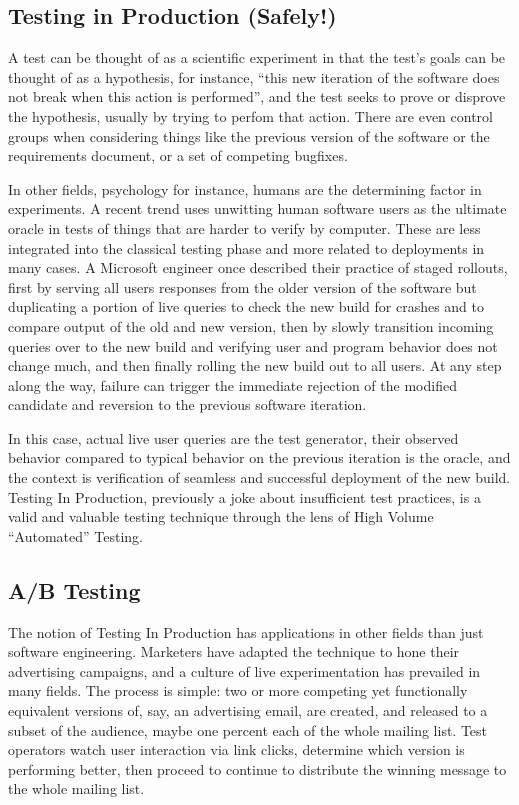 \subsection{Testing in Production (Safely!)}
A test can be thought of as a scientific experiment in that the test's goals can be thought of as a hypothesis, for instance, ``this new iteration of the software does not break when this action is performed'', and the test seeks to prove or disprove the hypothesis, usually by trying to perfom that action. There are even control groups when considering things like the previous version of the software or the requirements document, or a set of competing bugfixes.

In other fields, psychology for instance, humans are the determining factor in experiments. A recent trend uses unwitting human software users as the ultimate oracle in tests of things that are harder to verify by computer. These are less integrated into the classical testing phase and more related to deployments in many cases. A Microsoft engineer once described their practice of staged rollouts, first by serving all users responses from the older version of the software but duplicating a portion of live queries to check the new build for crashes and to compare output of the old and new version, then by slowly transition incoming queries over to the new build and verifying user and program behavior does not change much, and then finally rolling the new build out to all users. At any step along the way, failure can trigger the immediate rejection of the modified candidate and reversion to the previous software iteration. \citep{AndrewsHeal}

In this case, actual live user queries are the test generator, their observed behavior compared to typical behavior on the previous iteration is the oracle, and the context is verification of seamless and successful deployment of the new build. Testing In Production, previously a joke about insufficient test practices, is a valid and valuable testing technique through the lens of High Volume ``Automated'' Testing.

\subsection{A/B Testing}
The notion of Testing In Production has applications in other fields than just software engineering. Marketers have adapted the technique to hone their advertising campaigns, and a culture of live experimentation has prevailed in many fields. The process is simple: two or more competing yet functionally equivalent versions of, say, an advertising email, are created, and released to a subset of the audience, maybe one percent each of the whole mailing list. Test operators watch user interaction via link clicks, determine which version is performing better, then proceed to continue to distribute the winning message to the whole mailing list.

